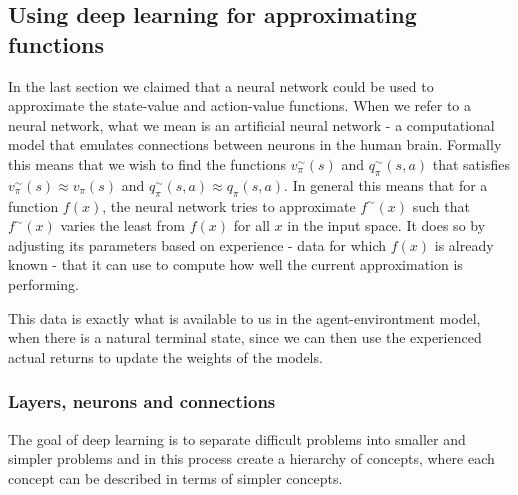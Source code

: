 \documentclass[11pt]{article}
\begin{document}
\maketitle

\subsection{Using deep learning for approximating functions}

In the last section we claimed that a neural network could be used to approximate the
state-value and action-value functions.
When we refer to a neural network, what we mean is an artificial neural network -
a computational model that emulates connections between neurons in the human brain.
Formally this means that we wish to find the functions $v_\pi^{\sim}(s)$ and $q_\pi^{\sim}(s,a)$ that
satisfies $v_\pi^{\sim}(s) \approx v_\pi(s)$ and $q_\pi^{\sim}(s,a) \approx q_\pi(s, a)$.
In general this means that for a function $f(x)$, the neural network tries to approximate
$f^{\sim}(x)$ such that $f^{\sim}(x)$ varies the least from $f(x)$ for all $x$ in the input
space\cite{DeepLearningBook}.
It does so by adjusting its parameters based on experience - data for which $f(x)$ is already known -
that it can use to compute how well the current approximation is performing.

This data is exactly what is available to us in the agent-environtment model, when there is a natural terminal state,
since we can then use the experienced actual returns to update the weights of the models.

\subsubsection{Layers, neurons and connections}

The goal of deep learning is to separate difficult problems into smaller and simpler problems
and in this process create a hierarchy of concepts, where each concept can be described in terms
of simpler concepts\cite{DeepLearningBook}.
\end{document}
